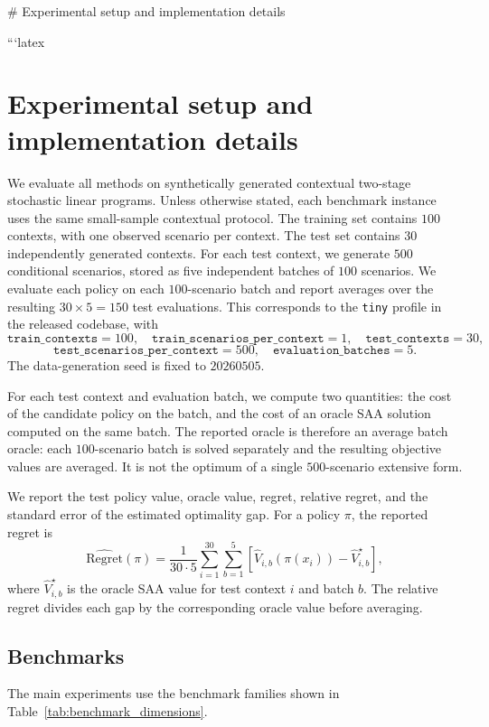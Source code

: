 # Experimental setup and implementation details

```latex
\section{Experimental setup and implementation details}

We evaluate all methods on synthetically generated contextual two-stage stochastic linear programs. Unless otherwise stated, each benchmark instance uses the same small-sample contextual protocol. The training set contains $100$ contexts, with one observed scenario per context. The test set contains $30$ independently generated contexts. For each test context, we generate $500$ conditional scenarios, stored as five independent batches of $100$ scenarios. We evaluate each policy on each $100$-scenario batch and report averages over the resulting $30\times 5 = 150$ test evaluations. This corresponds to the \texttt{tiny} profile in the released codebase, with
\[
\texttt{train\_contexts}=100,
\quad
\texttt{train\_scenarios\_per\_context}=1,
\quad
\texttt{test\_contexts}=30,
\]
\[
\texttt{test\_scenarios\_per\_context}=500,
\quad
\texttt{evaluation\_batches}=5.
\]
The data-generation seed is fixed to $20260505$.

For each test context and evaluation batch, we compute two quantities: the cost of the candidate policy on the batch, and the cost of an oracle SAA solution computed on the same batch. The reported oracle is therefore an average batch oracle: each $100$-scenario batch is solved separately and the resulting objective values are averaged. It is not the optimum of a single $500$-scenario extensive form.

We report the test policy value, oracle value, regret, relative regret, and the standard error of the estimated optimality gap. For a policy $\pi$, the reported regret is
\[
\widehat{\mathrm{Regret}}(\pi)
=
\frac{1}{30\cdot 5}
\sum_{i=1}^{30}
\sum_{b=1}^{5}
\left[
\widehat V_{i,b}(\pi(x_i))
-
\widehat V_{i,b}^{\star}
\right],
\]
where $\widehat V_{i,b}^{\star}$ is the oracle SAA value for test context $i$ and batch $b$. The relative regret divides each gap by the corresponding oracle value before averaging.

\subsection{Benchmarks}

The main experiments use the benchmark families shown in Table~\ref{tab:benchmark_dimensions}.


